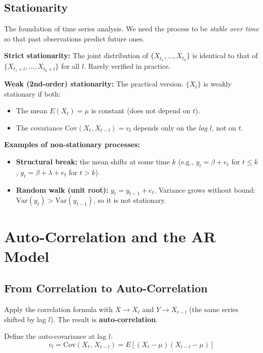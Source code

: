 \documentclass[11pt]{article}
\begin{document}
\subsection{Stationarity}
The foundation of time series analysis. We need the process to be
\emph{stable over time} so that past observations predict future ones.

\textbf{Strict stationarity:} The joint distribution of $\{X_{t_1},\ldots,X_{t_k}\}$
is identical to that of $\{X_{t_1+l},\ldots,X_{t_k+l}\}$ for all $l$. Rarely
verified in practice.

\textbf{Weak (2nd-order) stationarity:} The practical version. $\{X_t\}$ is weakly
stationary if both:
\begin{itemize}
    \item The mean $E(X_t) = \mu$ is constant (does not depend on $t$).
    \item The covariance $\text{Cov}(X_t, X_{t-l}) = v_l$ depends only on the
      \emph{lag} $l$, not on $t$.
\end{itemize}

\textbf{Examples of non-stationary processes:}
\begin{itemize}
    \item \textbf{Structural break:} the mean shifts at some time $k$
      (e.g., $y_t = \beta + e_t$ for $t \leq k$, $y_t = \beta + \lambda + e_t$
      for $t > k$).
    \item \textbf{Random walk (unit root):} $y_t = y_{t-1} + e_t$.
      Variance grows without bound: $\text{Var}(y_t) > \text{Var}(y_{t-1})$,
      so it is not stationary.
\end{itemize}

\newpage
\section{Auto-Correlation and the AR Model}

\subsection{From Correlation to Auto-Correlation}
Apply the correlation formula with $X \to X_t$ and $Y \to X_{t-l}$ (the same series
shifted by lag $l$). The result is \textbf{auto-correlation}.

Define the auto-covariance at lag $l$:
\[
v_l = \text{Cov}(X_t,\, X_{t-l}) = E[(X_t - \mu)(X_{t-l} - \mu)]
\]
\end{document}
